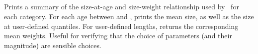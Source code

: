 \subsection{\label{sec:report-age-size-weight}}

\TODO

Prints a summary of the size-at-age and size-weight relationship used by \SPM\ for each category. For each age between  and , prints the mean size, as well as the size at user-defined quantiles. For user-defined lengths, returns the corresponding mean weights. Useful for verifying that the choice of parameters (and their magnitude) are sensible choices.

\TODOend